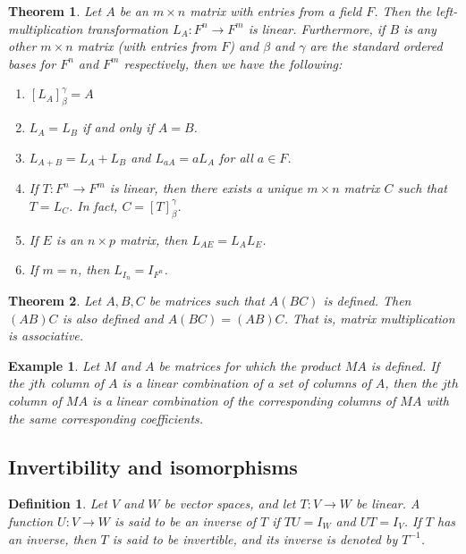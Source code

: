 \documentclass[a4paper]{article}
\newtheorem{mytheorem}{Theorem}
\newtheorem{example}{Example}
\newtheorem{mydef}{Definition}
\numberwithin{mytheorem}{section}
\numberwithin{mydef}{section}
\numberwithin{example}{section}
\begin{document}
\begin{mytheorem}Let $A$ be an $m \times n$ matrix with entries from a field $F$. Then the left-multiplication transformation $L_{A}: F^{n} \rightarrow F^{m}$ is linear. Furthermore, if $B$ is any other $m \times n$ matrix (with entries from $F$) and $\beta$ and $\gamma$ are the standard ordered bases for $F^{n}$ and $F^{m}$ respectively, then we have the following:
\begin{enumerate} 
\item $[L_{A}]^{\gamma}_{\beta} = A$
\item $L_{A} = L_{B}$ if and only if $A = B$.
\item $L_{A+B} = L_{A} + L_{B}$ and $L_{aA} = aL_{A}$ for all $a \in F$.
\item If $T: F^{n} \rightarrow F^{m}$ is linear, then there exists a unique $m \times n$ matrix $C$ such that $T = L_{C}$. In fact, $C = [T]^{\gamma}_{\beta}$.
\item If $E$ is an $n \times p$ matrix, then $L_{AE} = L_{A}L_{E}$.
\item If $m = n$, then $L_{I_{n}} = I_{F^{n}}$.
\end{enumerate}
\end{mytheorem}

\begin{mytheorem} Let $A,B,C$ be matrices such that $A(BC)$ is defined. Then $(AB)C$ is also defined and $A(BC) = (AB)C$. That is, matrix multiplication is associative.
\end{mytheorem}

\begin{example} Let $M$ and $A$ be matrices for which the product $MA$ is defined. If the $jth$ column of $A$ is a linear combination of a set of columns of $A$, then the $jth$ column of $MA$ is a linear combination of the corresponding columns of $MA$ with the same corresponding coefficients.
\end{example}

\subsection{Invertibility and isomorphisms}

\begin{mydef} Let $V$ and $W$ be vector spaces, and let $T: V \rightarrow W$ be linear. A function $U: V \rightarrow W$ is said to be an inverse of $T$ if $TU = I_{W}$ and $UT = I_{V}$. If $T$ has an inverse, then $T$ is said to be invertible, and its inverse is denoted by $T^{-1}$.
\end{mydef}
\end{document}
